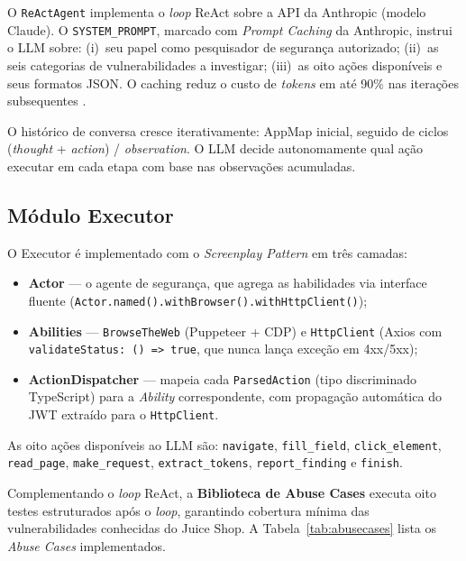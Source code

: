 \documentclass[
    10pt,
    twocolumn,
    a4paper
]{article}
\begin{document}
O \texttt{ReActAgent} implementa o \textit{loop} ReAct sobre a API da
Anthropic (modelo Claude). O \texttt{SYSTEM\_PROMPT}, marcado com
\textit{Prompt Caching} da Anthropic, instrui o LLM sobre: (i)~seu
papel como pesquisador de segurança autorizado; (ii)~as seis categorias
de vulnerabilidades a investigar; (iii)~as oito ações disponíveis e
seus formatos JSON. O caching reduz o custo de \textit{tokens} em até
90\% nas iterações subsequentes \cite{anthropicpromptcaching}.

O histórico de conversa cresce iterativamente: AppMap inicial,
seguido de ciclos (\textit{thought} + \textit{action}) /
\textit{observation}. O LLM decide autonomamente qual ação executar
em cada etapa com base nas observações acumuladas.

\subsection{Módulo Executor}

O Executor é implementado com o \textit{Screenplay Pattern}
\cite{serenityscreenplay} em três camadas:

\begin{itemize}\setlength{\itemsep}{2pt}
  \item \textbf{Actor} --- o agente de segurança, que agrega as
  habilidades via interface fluente
  (\texttt{Actor.named().withBrowser().withHttpClient()});

  \item \textbf{Abilities} --- \texttt{BrowseTheWeb} (Puppeteer +
  CDP) e \texttt{HttpClient} (Axios com \texttt{validateStatus:
  () => true}, que nunca lança exceção em 4xx/5xx);

  \item \textbf{ActionDispatcher} --- mapeia cada
  \texttt{ParsedAction} (tipo discriminado TypeScript) para a
  \textit{Ability} correspondente, com propagação automática do JWT
  extraído para o \texttt{HttpClient}.
\end{itemize}

As oito ações disponíveis ao LLM são: \texttt{navigate},
\texttt{fill\_field}, \texttt{click\_element}, \texttt{read\_page},
\texttt{make\_request}, \texttt{extract\_tokens},
\texttt{report\_finding} e \texttt{finish}.

Complementando o \textit{loop} ReAct, a \textbf{Biblioteca de Abuse
Cases} executa oito testes estruturados após o \textit{loop},
garantindo cobertura mínima das vulnerabilidades conhecidas do Juice
Shop. A Tabela~\ref{tab:abusecases} lista os \textit{Abuse Cases}
implementados.
\end{document}
